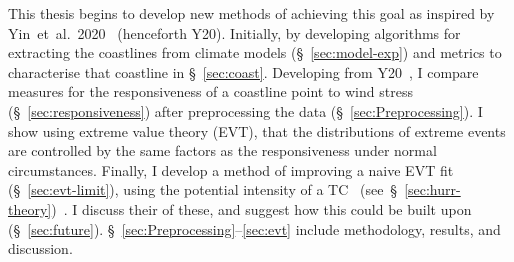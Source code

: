 This thesis begins to develop new methods of achieving this goal
as inspired by Yin~et~al.~2020~\cite{ZannaPreprint} (henceforth Y20).
Initially, by developing algorithms for extracting the coastlines from climate models (§~\ref{sec:model-exp})
and metrics to characterise that coastline in §~\ref{sec:coast}.
Developing from Y20~\cite{ZannaPreprint}, I compare measures for the
responsiveness of a coastline point to wind stress (§~\ref{sec:responsiveness})
after preprocessing the data (§~\ref{sec:Preprocessing}).
I show using extreme value theory (EVT), that the
distributions of extreme events are controlled by the same factors as
the responsiveness under normal circumstances.
Finally, I develop a
method of improving a naive EVT fit (§~\ref{sec:evt-limit}),
using the potential intensity of a TC~\cite{emanuel1999thermodynamic}
(see~§~\ref{sec:hurr-theory})~\cite{emanuel1987dependence,
 emanuel2016predictability}.
I discuss their of these,
and suggest how this could be built upon (§~\ref{sec:future}).
§~\ref{sec:Preprocessing}--\ref{sec:evt} include methodology,
results, and discussion.
